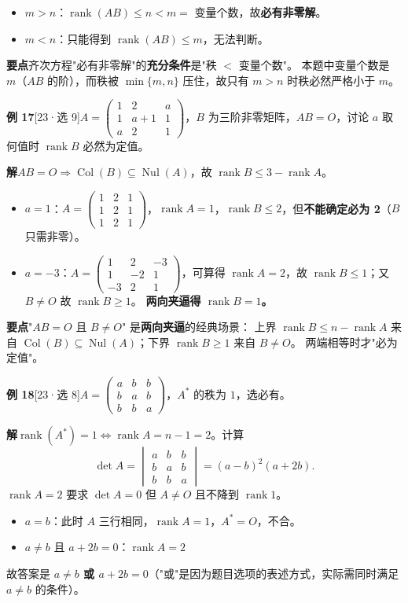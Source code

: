 \documentclass[10pt]{ctexart}
\newcommand{\rank}{\operatorname{rank}}
\newcommand{\Nul}{\operatorname{Nul}}
\newcommand{\Col}{\operatorname{Col}}
\newcommand{\bv}[1]{\begin{pmatrix}#1\end{pmatrix}}
\newcommand{\yiii}[1]{\textcolor{y23}{[23·#1]}}
\begin{document}
\begin{itemize}
\item $m>n$：$\rank(AB)\le n<m=$ 变量个数，故\textbf{必有非零解}。
\item $m<n$：只能得到 $\rank(AB)\le m$，无法判断。
\end{itemize}

\begin{tipbox}
\textbf{要点}\quad 齐次方程"必有非零解"的\textbf{充分条件}是"秩 $<$ 变量个数"。
本题中变量个数是 $m$（$AB$ 的阶），而秩被 $\min\{m,n\}$ 压住，故只有 $m>n$ 时秩必然严格小于 $m$。
\end{tipbox}

\medskip
\textbf{例 17}\yiii{选 9}\quad $A=\bv{1&2&a\\1&a+1&1\\a&2&1}$，$B$ 为三阶非零矩阵，$AB=O$，讨论 $a$ 取何值时 $\rank B$ 必然为定值。

\textbf{解}\quad $AB=O\Rightarrow\Col(B)\subseteq\Nul(A)$，故 $\rank B\le 3-\rank A$。

\begin{itemize}
\item $a=1$：$A=\bv{1&2&1\\1&2&1\\1&2&1}$，$\rank A=1$，$\rank B\le2$，但\textbf{不能确定必为 2}（$B$ 只需非零）。
\item $a=-3$：$A=\bv{1&2&-3\\1&-2&1\\-3&2&1}$，可算得 $\rank A=2$，故 $\rank B\le1$；又 $B\ne O$ 故 $\rank B\ge1$。
\textbf{两向夹逼得 $\rank B=1$。}
\end{itemize}

\begin{tipbox}
\textbf{要点}\quad "$AB=O$ 且 $B\neq O$" 是\textbf{两向夹逼}的经典场景：
上界 $\rank B\le n-\rank A$ 来自 $\Col(B)\subseteq\Nul(A)$；下界 $\rank B\ge1$ 来自 $B\ne O$。
两端相等时才"必为定值"。
\end{tipbox}

\medskip
\textbf{例 18}\yiii{选 8}\quad $A=\bv{a&b&b\\b&a&b\\b&b&a}$，$A^{*}$ 的秩为 $1$，选必有。

\textbf{解}\quad $\rank(A^{*})=1\iff\rank A=n-1=2$。计算
\[
\det A=\begin{vmatrix}a&b&b\\b&a&b\\b&b&a\end{vmatrix}=(a-b)^2(a+2b).
\]
$\rank A=2$ 要求 $\det A=0$ 但 $A\ne O$ 且不降到 $\rank1$。
\begin{itemize}
\item $a=b$：此时 $A$ 三行相同，$\rank A=1$，$A^{*}=O$，不合。
\item $a\ne b$ 且 $a+2b=0$：$\rank A=2$ \checkmark
\end{itemize}
故答案是 \textbf{$a\ne b$ 或 $a+2b=0$}（"或"是因为题目选项的表述方式，实际需同时满足 $a\neq b$ 的条件）。
\end{document}
